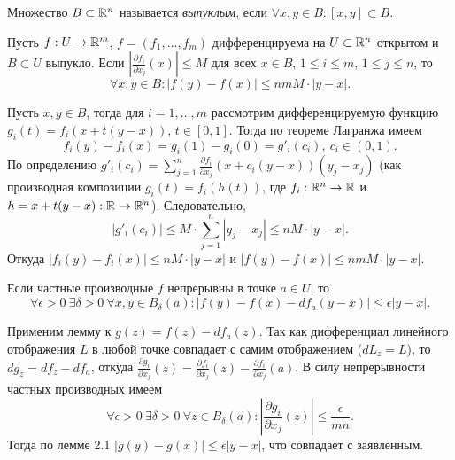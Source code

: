 \begin{reminder}
	Множество $B \subset \mathbb{R}^n$ называется \textit{выпуклым}, если $\forall x , y \in B : [x, y] \subset B$.
\end{reminder}

\begin{lemma}
	Пусть $f : U \to \mathbb{R}^m$, $f = (f_1, \dotsc, f_m)$ дифференцируема на $U \subset \mathbb{R}^n$ открытом и $B \subset U$ выпукло. 
	Если $|\frac{\partial f_i}{\partial x_j}(x)| \leq M$ для всех $x \in B$, $1 \leq i \leq m$, $1 \leq j \leq n$, то 
	\[ \forall x, y \in B : |f(y) - f(x)| \leq  nmM \cdot |y - x|. \]
\end{lemma}

\begin{myproof}
	Пусть $x, y \in B$, тогда для $i = 1, \dotsc, m$ рассмотрим дифференцируемую функцию $g_i(t) = f_i(x + t(y - x))$, $t \in [0, 1]$.
	Тогда по теореме Лагранжа имеем 
	\[ f_i(y) - f_i(x) = g_i(1) - g_i(0) = g'_i(c_i), \ c_i \in (0, 1). \]
	По определению $g'_i(c_i) = \sum \limits_{j=1}^{n} \frac{\partial f_i}{\partial x_j} (x + c_i(y - x))(y_j - x_j)$ (как производная композиции $g_i(t) = f_i(h(t))$, где $f_i : \mathbb{R}^n \to \mathbb{R}$ и $h = x+t(y-x) : \mathbb{R} \to \mathbb{R}^n$).  
	Следовательно,
	\[ |g'_i(c_i)| \leq M \cdot \sum \limits_{j=1}^{n} |y_j - x_j| \leq nM\cdot |y - x|. \]
	Откуда $|f_i(y) - f_i(x)| \leq nM \cdot |y - x|$ и $|f(y) - f(x)| \leq nm M \cdot |y - x|$. 
\end{myproof}

\begin{corollary}
	Если частные производные $f$ непрерывны в точке $a \in U$, то 
	\[ \forall \epsilon > 0 \ \exists \delta > 0 \ \forall x, y \in B_{\delta}(a) : |f(y) - f(x) - df_a (y-x)| \leq \epsilon |y - x|. \]
\end{corollary}

\begin{myproof}
	Применим лемму к $g(z) = f(z) - df_a(z)$. 
	Так как дифференциал линейного отображения $L$ в любой точке совпадает с самим отображением ($dL_z = L$), то 
	$dg_z = df_z - df_a$, откуда $\frac{\partial g_i}{\partial x_j}(z) = \frac{\partial f_i}{\partial x_j} (z) - \frac{\partial f_i}{\partial x_j} (a)$. 
	В силу непрерывности частных производных имеем
	\[ \forall \epsilon > 0 \ \exists \delta > 0 \ \forall z \in B_{\delta}(a) : \left|\frac{\partial g_i}{\partial x_j} (z)\right| \leq \frac{\epsilon}{mn}. \]
	Тогда по лемме 2.1 $|g(y) - g(x)| \leq \epsilon |y - x|$, что совпадает с заявленным.
\end{myproof}

